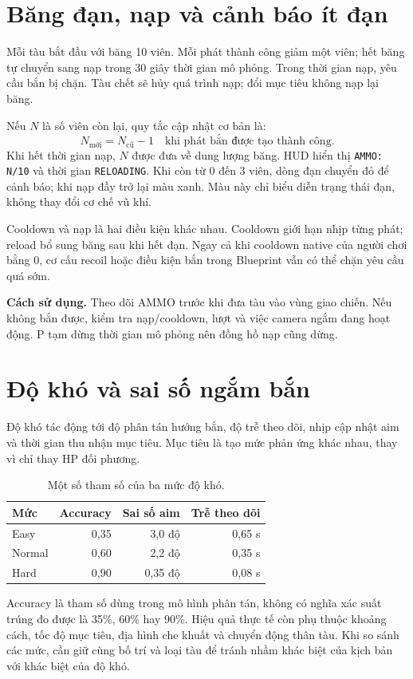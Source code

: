 \documentclass[11pt,a4paper,oneside]{report}
\newcommand{\howto}[1]{\par\smallskip\noindent\textbf{Cách sử dụng.} #1\par}
\begin{document}
\section{Băng đạn, nạp và cảnh báo ít đạn}
Mỗi tàu bắt đầu với băng 10 viên. Mỗi phát thành công giảm một viên; hết băng tự chuyển sang nạp trong 30 giây thời gian mô phỏng. Trong thời gian nạp, yêu cầu bắn bị chặn. Tàu chết sẽ hủy quá trình nạp; đổi mục tiêu không nạp lại băng.

Nếu $N$ là số viên còn lại, quy tắc cập nhật cơ bản là:
\[
 N_{\text{mới}}=N_{\text{cũ}}-1\quad\text{khi phát bắn được tạo thành công}.
\]
Khi hết thời gian nạp, $N$ được đưa về dung lượng băng. HUD hiển thị \texttt{AMMO: N/10} và thời gian \texttt{RELOADING}. Khi còn từ 0 đến 3 viên, dòng đạn chuyển đỏ để cảnh báo; khi nạp đầy trở lại màu xanh. Màu này chỉ biểu diễn trạng thái đạn, không thay đổi cơ chế vũ khí.

Cooldown và nạp là hai điều kiện khác nhau. Cooldown giới hạn nhịp từng phát; reload bổ sung băng sau khi hết đạn. Ngay cả khi cooldown native của người chơi bằng 0, cơ cấu recoil hoặc điều kiện bắn trong Blueprint vẫn có thể chặn yêu cầu quá sớm.
\howto{Theo dõi AMMO trước khi đưa tàu vào vùng giao chiến. Nếu không bắn được, kiểm tra nạp/cooldown, lượt và việc camera ngắm đang hoạt động. P tạm dừng thời gian mô phỏng nên đồng hồ nạp cũng dừng.}

\section{Độ khó và sai số ngắm bắn}
Độ khó tác động tới độ phân tán hướng bắn, độ trễ theo dõi, nhịp cập nhật aim và thời gian thu nhận mục tiêu. Mục tiêu là tạo mức phản ứng khác nhau, thay vì chỉ thay HP đối phương.
\begin{table}[H]\centering\small
\caption{Một số tham số của ba mức độ khó.}
\begin{tabular}{@{}lrrr@{}}\toprule
\textbf{Mức}&\textbf{Accuracy}&\textbf{Sai số aim}&\textbf{Trễ theo dõi}\\\midrule
Easy&0,35&3,0 độ&0,65 s\\
Normal&0,60&2,2 độ&0,35 s\\
Hard&0,90&0,35 độ&0,08 s\\\bottomrule
\end{tabular}\end{table}

Accuracy là tham số dùng trong mô hình phân tán, không có nghĩa xác suất trúng đo được là 35\%, 60\% hay 90\%. Hiệu quả thực tế còn phụ thuộc khoảng cách, tốc độ mục tiêu, địa hình che khuất và chuyển động thân tàu. Khi so sánh các mức, cần giữ cùng bố trí và loại tàu để tránh nhầm khác biệt của kịch bản với khác biệt của độ khó.
\end{document}

